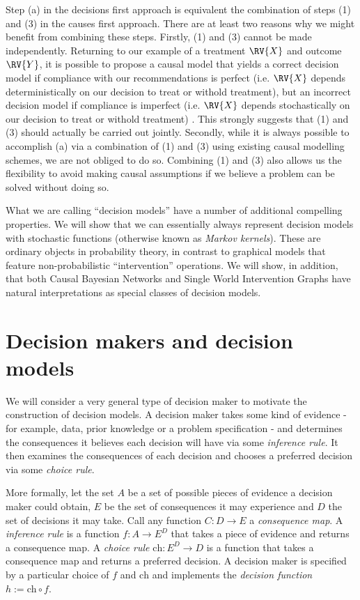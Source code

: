 Step (a) in the decisions first approach is equivalent the combination of steps (1) and (3) in the causes first approach. There are at least two reasons why we might benefit from combining these steps. Firstly, (1) and (3) cannot be made independently. Returning to our example of a treatment $\RV{X}$ and outcome $\RV{Y}$, it is possible to propose a causal model that yields a correct decision model if compliance with our recommendations is perfect (i.e. $\RV{X}$ depends deterministically on our decision to treat or withold treatment), but an incorrect decision model if compliance is imperfect (i.e. $\RV{X}$ depends stochastically on our decision to treat or withold treatment) \citep{heckman_policy-relevant_2001}.  This strongly suggests that (1) and (3) should actually be carried out jointly. Secondly, while it is always possible to accomplish (a) via a combination of (1) and (3) using existing causal modelling schemes, we are not obliged to do so. Combining (1) and (3) also allows us the flexibility to avoid making causal assumptions if we believe a problem can be solved without doing so.

What we are calling ``decision models'' have a number of additional compelling properties. We will show that we can essentially always represent decision models with stochastic functions (otherwise known as \emph{Markov kernels}). These are ordinary objects in probability theory, in contrast to graphical models that feature non-probabilistic ``intervention'' operations. We will show, in addition, that both Causal Bayesian Networks and Single World Intervention Graphs have natural interpretations as special classes of decision models.

\section{Decision makers and decision models}

We will consider a very general type of decision maker to motivate the construction of decision models. A decision maker takes some kind of evidence - for example, data, prior knowledge or a problem specification - and determines the consequences it believes each decision will have via some \emph{inference rule}. It then examines the consequences of each decision and chooses a preferred decision via some \emph{choice rule}. 

More formally, let the set $A$ be a set of possible pieces of evidence a decision maker could obtain, $E$ be the set of consequences it may experience and $D$ the set of decisions it may take. Call any function $C:D\to E$ a \emph{consequence map}. A \emph{inference rule} is a function $f:A\to E^D$ that takes a piece of evidence and returns a consequence map. A \emph{choice rule} $\mathrm{ch}:E^D\to D$ is a function that takes a consequence map and returns a preferred decision. A decision maker is specified by a particular choice of $f$ and $\mathrm{ch}$ and implements the \emph{decision function} $h:=\mathrm{ch}\circ f$.

